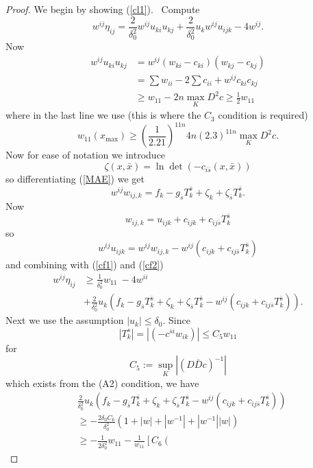 \documentclass[11pt,letterpaper]{amsart}%
\numberwithin{equation}{section}
\begin{document}
\begin{proof}
We begin by showing  (\ref{cl1}). \ Compute%
\begin{equation}
w^{ij}\eta_{ij}=\frac{2}{\delta_{0}^{2}}w^{ij}u_{ki}u_{kj}+\frac{2}{\delta
_{0}^{2}}u_{k}w^{ij}u_{ijk}-4w^{ij}. \label{cf1}%
\end{equation}
Now
\begin{align}
w^{ij}u_{ki}u_{kj}  &  =w^{ij}\left(  w_{ki}-c_{ki}\right)  \left(
w_{kj}-c_{kj}\right) \nonumber\\
&  =\sum w_{ii}-2\sum c_{ii}+w^{ij}c_{ki}c_{kj}\nonumber\\
&  \geq w_{11}-2n\max_{K}D^{2}c\geq\frac{1}{2}w_{11}\ \label{cf2}%
\end{align}
where in the last line we use (this is where the $C_{3}$ condition is
required)\
\[
w_{11}(x_{\max})\geq\left(  \frac{1}{2.21}\right)  ^{11n}4n\left(  2.3\right)
^{11n}\max_{K}D^{2}c.
\]
Now for ease of notation we introduce
\[
\zeta(x,\bar{x})=\ln\det(-c_{i\bar{s}}(x,\bar{x}))
\]
so differentiating (\ref{MAE}) we get
\[
w^{ij}w_{ij,k}=f_{k}-g_{\bar{s}}T_{k}^{\bar{s}}+\zeta_{k}+\zeta_{\bar{s}}%
T_{k}^{\bar{s}}.
\]
Now
\[
w_{ij,k}=u_{ijk}+c_{ijk}+c_{ij\bar{s}}T_{k}^{\bar{s}}%
\]
so%
\[
w^{ij}u_{ijk}=w^{ij}w_{ij,k}-w^{ij}\left(  c_{ijk}+c_{ij\bar{s}}T_{k}^{\bar
{s}}\right)
\]
and combining with (\ref{cf1}) and (\ref{cf2})%
\begin{align*}
w^{ij}\eta_{ij}  &  \geq\frac{1}{\delta_{0}^{2}}w_{11}\ -4w^{ii}\\
&  +\frac{2}{\delta_{0}^{2}}u_{k}\left(  f_{k}-g_{\bar{s}}T_{k}^{\bar{s}%
}+\zeta_{k}+\zeta_{\bar{s}}T_{k}^{\bar{s}}-w^{ij}\left(  c_{ijk}+c_{ij\bar{s}%
}T_{k}^{\bar{s}}\right)  \right)  .
\end{align*}
Next we use the assumption $\left\vert u_{k}\right\vert \leq\delta_{0}$.
Since
\[
\left\vert T_{k}^{s}\right\vert =\left\vert \left(  -c^{\bar{s}i}w_{ik}\right)
\right\vert \leq C_{5}w_{11}%
\]
for
\[
C_{5}:=\sup_{K}\left\vert \left(  D\bar{D}c\right)  ^{-1}\right\vert
\]
which exists from the (A2) condition, we have
\begin{align*}
&  \frac{2}{\delta_{0}^{2}}u_{k}\left(  f_{k}-g_{\bar{s}}T_{k}^{\bar{s}}%
+\zeta_{k}+\zeta_{\bar{s}}T_{k}^{\bar{s}}-w^{ij}\left(  c_{ijk}+c_{ij\bar{s}%
}T_{k}^{\bar{s}}\right)  \right) \\
&  \geq-\frac{2\delta_{0}C_{6}}{\delta_{0}^{2}}\left(  1+\left\vert
w\right\vert +\left\vert w^{-1}\right\vert +\left\vert w^{-1}\right\vert
|w|\right) \\
&  \geq-\frac{1}{2\delta_{0}^{2}}w_{11}-\frac{1}{w_{11}}\left[  C_{6}\left(

\end{align*}
\end{proof}
\end{document}
